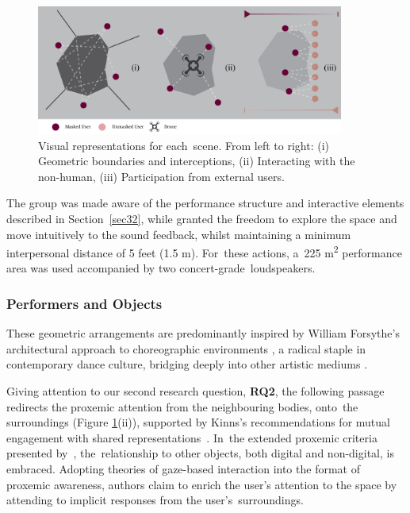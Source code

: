\begin{figure}
\includegraphics[width=0.9\textwidth,keepaspectratio]{Chapters/Figures/adse_ess/scenes_w_keycode.png}
{\caption{ %
Visual representations for each~scene. From left to right: (i) Geometric boundaries and interceptions, (ii) Interacting with the non-human, (iii) Participation from external users.}\label{fig1:structure}}
\end{figure}

The group was made aware of the performance structure and interactive elements described in Section~\ref{sec32}, while granted the freedom to explore the space and move intuitively to the sound feedback, whilst maintaining a minimum interpersonal distance of 5 feet (1.5 m). For~these actions, a~225 m\textsuperscript{2} performance area was used accompanied by two concert-grade~loudspeakers.

\subsubsection*{Performers and Objects}
\label{sec:structure_2}

These geometric arrangements are predominantly inspired by William Forsythe's architectural approach to choreographic environments \citep{forsythe_dance_1999}, a radical staple in contemporary dance culture, bridging deeply into other artistic mediums \citep{clark_geometry_2014}.

Giving attention to our second research question, \textbf{RQ2}, the following passage redirects the proxemic attention from the neighbouring bodies, onto~the surroundings (Figure \ref{fig1:structure}(ii)), supported by Kinns's
recommendations for mutual engagement with shared representations~\cite{bryan-kinns_mutual_2013}. In~the extended proxemic criteria presented by~\cite{ballendat_proxemic_2010}, the~relationship to other objects, both digital and non-digital, is embraced. Adopting theories of gaze-based interaction into the format of proxemic awareness, authors claim to enrich the user's attention to the space by attending to implicit responses from the user's~surroundings.

